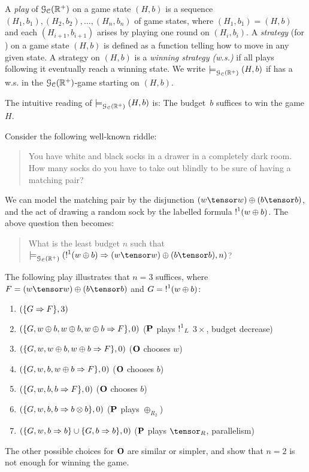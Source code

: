 \begin{definition}
A {\em play} of $\mathcal{G}_{\mathcal{C}}(\mathbb{R}^+)$ on a game state $(H,b)$ is a sequence $(H_1,b_1),(H_2,b_2),\ldots,(H_n,b_n)$ of game states, where $(H_1,b_1)=(H,b)$ and each $(H_{i+1},b_{i+1})$ arises by playing one round on $(H_i,b_i)$.
 A {\em strategy} (for \I) on a game state $(H,b)$ is defined as a function telling \I how to move in any given state. 
 A strategy on $(H,b)$ is a {\em winning strategy (w.s.)} if all plays following it eventually reach a winning state.
We write $\models^{}_{\mathcal{G}_{\mathcal{C}}(\mathbb{R}^+)}(H,b)$ if \I has a w.s. in the $\mathcal{G}_{\mathcal{C}}(\mathbb{R}^+)$-game starting on $(H,b)$. 
\end{definition}
The intuitive reading of $\models^{}_{\mathcal{G}_{\mathcal{C}}(\mathbb{R}^+)}(H,b)$ is: The budget~$b$ suffices to win the game $H$.

\begin{example}\label{ex:riddle}
Consider the following well-known riddle:
\begin{quote}
You have white and black socks in a drawer in a completely dark room. How many socks do you have to take out blindly to be sure of having a matching pair? 
\end{quote}
We can model the matching pair by the disjunction $(w\tensor w)\oplus(b\tensor b)$, and the act of drawing a random sock by the labelled formula $\hbox{$\mathop{!}^{1}$}(w\oplus b)$. The above question then becomes:
\begin{quote}
What is the least budget $n$  such that $\wins{}{\GAIMALLR}(\nbang{1}(w\oplus b)\seq (w\tensor w)\oplus(b\tensor b),n)$?
\end{quote}
The following play illustrates that $n=3$ suffices, where $F=(w\tensor w)\oplus(b\tensor b)$ and $G=\hbox{$\mathop{!}^{1}$}(w\oplus b)$:
\begin{enumerate}
\item $(\{G\Rightarrow F\},3)$ 
\item $(\{G, w\oplus b, w\oplus b, w\oplus b\Rightarrow F\},0)$ ($\mathbf{P}$ plays $\hbox{$\mathop{!}^{1}$}_L$ $3\times$, budget decrease)
\item $(\{G, w, w\oplus b, w\oplus b\Rightarrow F\},0)$ ($\mathbf{O}$ chooses $w$)
\item $(\{G, w, b, w\oplus b\Rightarrow F\},0)$ ($\mathbf{O}$ chooses $b$)
\item $(\{G, w, b, b\Rightarrow F\},0)$ ($\mathbf{O}$ chooses $b$)
\item $(\{G, w, b, b\Rightarrow b\otimes b\},0)$  ($\mathbf{P}$ plays $\oplus_{R_2}$)
\item $(\{G, w, b\Rightarrow b\}\cup \{G, b\Rightarrow b\},0)$ ($\mathbf{P}$ plays $\tensor_R$, parallelism)
\end{enumerate}
The other possible choices for $\mathbf{O}$ are similar or simpler, and show that $n=2$ is not enough for winning the game.
\end{example}
